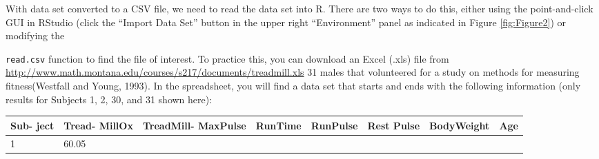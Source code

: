 \documentclass[]{book}
\begin{document}
With data set converted to a CSV file, we need to read the data set into
R. There are two ways to do this, either using the point-and-click GUI
in RStudio (click the ``Import Data Set'' button in the upper right
``Environment'' panel as indicated in Figure \ref{fig:Figure2}) or
modifying the

\texttt{read.csv} function to find the file of interest. To practice
this, you can download an Excel (.xls) file from
\url{http://www.math.montana.edu/courses/s217/documents/treadmill.xls}
31 males that volunteered for a study on methods for measuring
fitness(Westfall and Young, 1993). In the spreadsheet, you will find a
data set that starts and ends with the following information (only
results for Subjects 1, 2, 30, and 31 shown here):

\begin{longtable}[]{@{}lllrrlrr@{}}
\toprule
\begin{minipage}[b]{0.07\columnwidth}\raggedright\strut
Sub- ject\strut
\end{minipage} & \begin{minipage}[b]{0.10\columnwidth}\raggedright\strut
Tread- MillOx\strut
\end{minipage} & \begin{minipage}[b]{0.14\columnwidth}\raggedright\strut
TreadMill- MaxPulse\strut
\end{minipage} & \begin{minipage}[b]{0.09\columnwidth}\raggedleft\strut
RunTime\strut
\end{minipage} & \begin{minipage}[b]{0.10\columnwidth}\raggedleft\strut
RunPulse\strut
\end{minipage} & \begin{minipage}[b]{0.08\columnwidth}\raggedright\strut
Rest Pulse\strut
\end{minipage} & \begin{minipage}[b]{0.15\columnwidth}\raggedleft\strut
BodyWeight\strut
\end{minipage} & \begin{minipage}[b]{0.04\columnwidth}\raggedleft\strut
Age\strut
\end{minipage}\tabularnewline
\midrule
\endhead
\begin{minipage}[t]{0.07\columnwidth}\raggedright\strut
1\strut
\end{minipage} & \begin{minipage}[t]{0.10\columnwidth}\raggedright\strut
60.05\strut
\end{minipage} & \begin{minipage}[t]{0.14\columnwidth}\raggedright\strut

\end{minipage}
\end{longtable}
\end{document}
